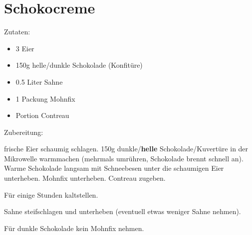 \section{Schokocreme}

Zutaten:

\begin{itemize}
    \item 3 Eier
	\item 150g helle/dunkle Schokolade (Konfitüre)
	\item 0.5 Liter Sahne
	\item 1 Packung Mohnfix
	\item Portion Contreau
\end{itemize}

\noindent Zubereitung:

 frische Eier schaumig schlagen. 150g dunkle/\textbf{helle}
Schokolade/Kuvertüre in der Mikrowelle warmmachen (mehrmals umrühren,
Schokolade brennt schnell an). Warme Schokolade langsam mit Schneebesen unter
die schaumigen Eier unterheben. Mohnfix unterheben. Contreau zugeben.

\noindent Für einige Stunden kaltstellen.

\noindent Sahne steifschlagen und unterheben (eventuell etwas weniger Sahne
nehmen).

\noindent Für dunkle Schokolade kein Mohnfix nehmen.


\newpage
\mbox{}
\vfill
\begin{center}
\end{center}
\vfill
\mbox{ }
\newpage
